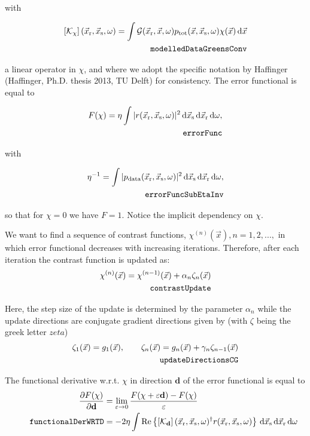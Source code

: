 \documentclass[10pt,a4paper]{article}
\newcommand{\partder}[2]{\ensuremath{\frac{\partial #1}{\partial #2}}}
\newcommand{\df}[1]{\, \ensuremath{\mbox{d}#1}}
\newcommand{\real}[1]{\text{Re} \left\{ #1 \right\}}
\newcommand{\xs}{\vec{x}_\text{s}}
\newcommand{\xr}{\vec{x}_\text{r}}
\newcommand{\x}{\vec{x}}
\begin{document}
with

\begin{align} \label{eq:modelledDataGreensConv} \left[\mathcal{K}_\chi \right](\xr,
\xs, \omega) = \int \mathcal{G}(\xr, \x, \omega) p_\text{tot}(\x, \xs,
\omega) \chi(\x) \df{\x}\\
\tag*{\texttt{modelledDataGreensConv}}
\end{align}

a linear operator in $\chi$, and where we adopt the specific notation
by Haffinger (Haffinger, Ph.D. thesis 2013, TU Delft) for consistency.
The error functional is equal to

\begin{align} \label{eq:errorFunc} F(\chi) = \eta \int |r(\xr, \xs,
\omega)|^2 \df{\vec{x}_\text{s}} \df{\xr}
\df{\omega},\\
\tag*{\texttt{errorFunc}}
\end{align}

with	

\begin{align} \label{eq:errorFuncSubEtaInv} \eta^{-1} = \int | p_\text{data}(\xr,
\xs, \omega) |^2 \df{\xs} \df{\xr} \df{\omega}, \\
\tag*{\texttt{errorFuncSubEtaInv}} 
 \end{align}

so that for $\chi = 0$ we have $F = 1$. Notice the implicit dependency
on $\chi$.

We want to find a sequence of contrast functions,
$\chi^{(n)}(\vec{x}), n = 1,2,...,$ in which error functional
decreases with increasing iterations. Therefore, after each iteration
the contrast function is updated as:
\begin{align} \label{eq:contrastUpdate} \chi^{(n)}(\vec{x}) =
\chi^{(n-1)}(\vec{x}) + \alpha_n\zeta_n(\vec{x})\\
\tag*{\texttt{contrastUpdate}}
\end{align}

Here, the step size of the update is determined by the parameter
$\alpha_n$ while the update directions are conjugate gradient
directions given by (with $\zeta$ being the greek letter $zeta$)
\begin{align} \label{eq:updateDirectionsCG}\zeta_1(\vec{x}) = g_1(\vec{x}), \qquad \zeta_n(\vec{x}) = g_n(\vec{x}) + \gamma_n\zeta_{n-1}(\vec{x})\\
\tag*{\texttt{updateDirectionsCG}}
\end{align}

The functional derivative w.r.t. $\chi$ in direction $\mathbf{d}$ of
the error functional is equal to
\begin{align}
\label{eq:functionalDerWRTD}
\partder{F(\mathbf{\chi})}{\mathbf{d}} & =
\lim_{\varepsilon \rightarrow 0} \frac{F(\mathbf{\chi} + \varepsilon
\mathbf{d}) - F(\mathbf{\chi})}{\varepsilon} \\
\tag*{\texttt{functionalDerWRTD}}
& = -2 \eta \int \real{\left[\mathcal{K}_\mathbf{d} \right](\xr, \xs,
\omega)^{\dagger} r (\xr, \xs, \omega)} \df{\xs} \df{\xr} \df{\omega}
\end{align}
\end{document}
